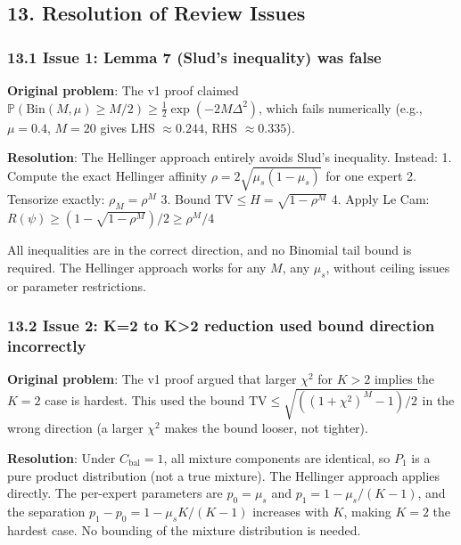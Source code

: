 \documentclass[
  12pt,
]{article}
\begin{document}
\subsection{13. Resolution of Review
Issues}\label{resolution-of-review-issues}

\subsubsection{13.1 Issue 1: Lemma 7 (Slud's inequality) was
false}\label{issue-1-lemma-7-sluds-inequality-was-false}

\textbf{Original problem}: The v1 proof claimed
\(\mathbb{P}(\text{Bin}(M,\mu) \geq M/2) \geq
\frac12 \exp(-2M\Delta^2)\), which fails numerically (e.g., \(\mu=0.4\),
\(M=20\) gives LHS \(\approx 0.244\), RHS \(\approx 0.335\)).

\textbf{Resolution}: The Hellinger approach entirely avoids Slud's
inequality. Instead: 1. Compute the exact Hellinger affinity
\(\rho = 2\sqrt{\mu_s(1-\mu_s)}\) for one expert 2. Tensorize exactly:
\(\rho_M = \rho^M\) 3. Bound \(\text{TV} \leq H = \sqrt{1-\rho^M}\) 4.
Apply Le Cam: \(R(\psi) \geq (1-\sqrt{1-\rho^M})/2 \geq \rho^M/4\)

All inequalities are in the correct direction, and no Binomial tail
bound is required. The Hellinger approach works for any \(M\), any
\(\mu_s\), without ceiling issues or parameter restrictions.

\subsubsection{13.2 Issue 2: K=2 to K\textgreater2 reduction used bound
direction
incorrectly}\label{issue-2-k2-to-k2-reduction-used-bound-direction-incorrectly}

\textbf{Original problem}: The v1 proof argued that larger \(\chi^2\)
for \(K>2\) implies the \(K=2\) case is hardest. This used the bound
\(\text{TV} \leq \sqrt{((1+\chi^2)^M-1)/2}\) in the wrong direction (a
larger \(\chi^2\) makes the bound looser, not tighter).

\textbf{Resolution}: Under \(C_{\text{bal}} = 1\), all mixture
components are identical, so \(P_1\) is a pure product distribution (not
a true mixture). The Hellinger approach applies directly. The per-expert
parameters are \(p_0 = \mu_s\) and \(p_1 = 1-\mu_s/(K-1)\), and the
separation \(p_1 - p_0 = 1 - \mu_s K/(K-1)\) increases with \(K\),
making \(K=2\) the hardest case. No bounding of the mixture distribution
is needed.
\end{document}
